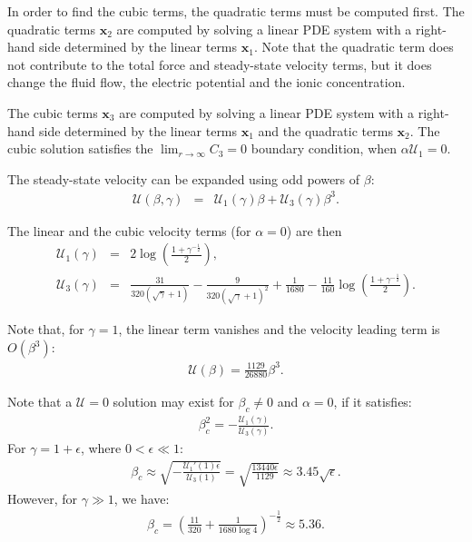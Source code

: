 \documentclass[10pt]{ijnam}
\newcommand\eps \epsilon
\newcommand{\pars}[1]{\left(#1\right)}
\newcommand\bx{\boldsymbol{x}}
\newcommand\cU{\mathscr{U}}
\begin{document}
In order to find the cubic terms, the quadratic terms must be computed first.
The quadratic terms $\bx_2$ are computed by solving a linear PDE system 
with a right-hand side determined by the linear terms $\bx_1$.
Note that the quadratic term does not contribute to the total force and steady-state 
velocity terms, but it does change the fluid flow, 
the electric potential and the ionic concentration.

The cubic terms $\bx_3$ are computed by solving a linear PDE system 
with a right-hand side determined by the linear terms $\bx_1$ and the quadratic terms $\bx_2$.
The cubic solution satisfies the $\lim_{r\rightarrow\infty}C_3 = 0$ boundary condition, 
when $\alpha\cU_1 = 0$.

The steady-state velocity can be expanded using odd powers of $\beta$:
\begin{eqnarray*}
\cU(\beta, \gamma) &=& \cU_1(\gamma) \beta + \cU_3(\gamma) \beta^3.
\end{eqnarray*}

The linear and the cubic velocity terms (for $\alpha = 0$) are then
\begin{eqnarray*}
\cU_1(\gamma) &=& 2 \log \pars{\frac{1 + \gamma^{-\frac{1}{2}}}{2}}, \\
\cU_3(\gamma) &=& \frac{31}{320(\sqrt\gamma + 1)} - \frac{9}{320(\sqrt\gamma + 1)^2} + \frac{1}{1680} - \frac{11}{160} \log \pars{\frac{1 + \gamma^{-\frac{1}{2}}}{2}}.
\end{eqnarray*}

Note that, for $\gamma = 1$, the linear term vanishes and the velocity leading term is $O(\beta^3)$:
\begin{eqnarray*}
\cU(\beta) = \frac{1129}{26880}\beta^3.
\end{eqnarray*}

Note that a $\cU = 0$ solution may exist for $\beta_c \ne 0$ and $\alpha = 0$, 
if it satisfies:
\begin{eqnarray*}
\beta_c^2 = -\frac{\cU_1(\gamma)}{\cU_3(\gamma)}.
\end{eqnarray*}
For $\gamma = 1 + \eps$, where $0 < \eps \ll 1$:
\begin{eqnarray*}
\beta_c \approx \sqrt{-\frac{\cU_1'(1) \eps}{\cU_3(1)}} = 
 \sqrt{\frac{13440 \eps}{1129}} \approx 3.45 \sqrt{\eps}.
\end{eqnarray*}
However, for $\gamma \gg 1$, we have:
\begin{eqnarray*}
\beta_c =  \pars{\frac{11}{320} + \frac{1}{1680 \log 4}}^{-\frac{1}{2}} \approx 5.36.
\end{eqnarray*}
\end{document}

